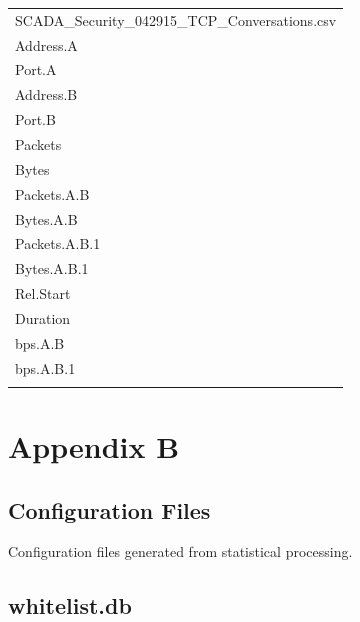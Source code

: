 \documentclass[12pt,]{article}
\begin{document}
\begin{longtable}[c]{@{}l@{}}
\toprule\addlinespace
SCADA\_Security\_042915\_TCP\_Conversations.csv
\\\addlinespace
\midrule\endhead
Address.A
\\\addlinespace
Port.A
\\\addlinespace
Address.B
\\\addlinespace
Port.B
\\\addlinespace
Packets
\\\addlinespace
Bytes
\\\addlinespace
Packets.A.B
\\\addlinespace
Bytes.A.B
\\\addlinespace
Packets.A.B.1
\\\addlinespace
Bytes.A.B.1
\\\addlinespace
Rel.Start
\\\addlinespace
Duration
\\\addlinespace
bps.A.B
\\\addlinespace
bps.A.B.1
\\\addlinespace
\bottomrule
\end{longtable}

\pagebreak

\section*{Appendix B}\label{appendix-b}

\subsection*{Configuration Files}\label{configuration-files}

Configuration files generated from statistical processing.

\subsection{whitelist.db}\label{whitelist.db}
\end{document}
